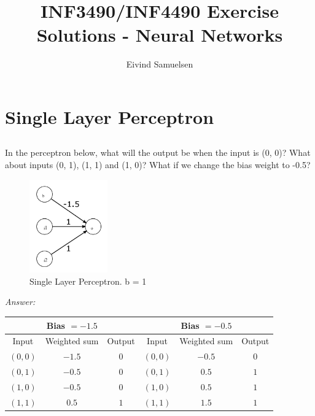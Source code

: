 
\title{\vspace{-2cm}INF3490/INF4490 Exercise Solutions - Neural Networks}
\author{Eivind Samuelsen}
\date{}

\setlength\parindent{0pt}


    \renewcommand\marginsymbol[1][0pt]{%
  \tabto*{0cm}\makebox[-1cm][c]{$\mathbb{P}$}\tabto*{\TabPrevPos}}

\maketitle


\section{Single Layer Perceptron}
\subsection{}
In the perceptron below, what will the output be when the input is (0, 0)?
What about inputs (0, 1), (1, 1) and (1, 0)?
What if we change the bias weight to -0.5?

\begin{figure}[H]
\begin{center}
\includegraphics[width=0.3\textwidth]{fig1.png}
\caption{Single Layer Perceptron. b = 1 }
\label{fig:slp}
\end{center}
\end{figure}

\noindent\textit{Answer:}

\noindent
\begin{center}
\begin{tabular}{|c|c|c|c|c|c|}
\hline
\multicolumn{3}{|c|}{Bias $=-1.5$} & \multicolumn{3}{c|}{Bias $=-0.5$}\tabularnewline
\hline
Input & Weighted sum & Output & Input & Weighted sum & Output\tabularnewline
\hline
\hline
$\left(0,0\right)$ & $-1.5$ & $0$ & $\left(0,0\right)$ & $-0.5$ & $0$\tabularnewline
\hline
$\left(0,1\right)$ & $-0.5$ & $0$ & $\left(0,1\right)$ & $0.5$ & $1$\tabularnewline
\hline
$\left(1,0\right)$ & $-0.5$ & $0$ & $\left(1,0\right)$ & $0.5$ & $1$\tabularnewline
\hline
$\left(1,1\right)$ & $0.5$ & $1$ & $\left(1,1\right)$ & $1.5$ & $1$\tabularnewline
\hline
\end{tabular}
\par\end{center}

